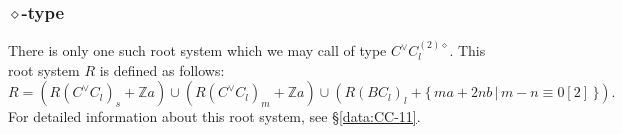 \documentclass[11pt]{amsart}
\newcommand{\Z}{\mathbb{Z}}
\newcommand{\rad}{\operatorname{rad}}
\begin{document}
\subsubsection{$\diamond$-type}\label{sect:intro_non-red-diamond}
There is only one such root system which we may call of type $C^\vee C_l^{(2)\diamond}$. This root system $R$ is defined as follows:
\[ R=(R(C^\vee C_l)_s+\Z a) \cup (R(C^\vee C_l)_m+\Z a) \cup (R(BC_l)_l+\{ \, ma+2nb\, \vert\,  m-n\equiv 0 [2]\, \}). \]
For detailed information about this root system, see \S \ref{data:CC-11}.
\medskip










\end{document}
